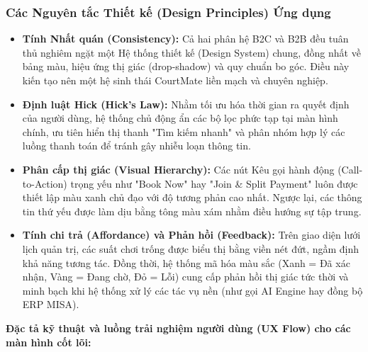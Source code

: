 \subsubsection{Các Nguyên tắc Thiết kế (Design Principles) Ứng dụng}
\begin{itemize}
    \item \textbf{Tính Nhất quán (Consistency):} Cả hai phân hệ B2C và B2B đều tuân thủ nghiêm ngặt một Hệ thống thiết kế (Design System) chung, đồng nhất về bảng màu, hiệu ứng thị giác (drop-shadow) và quy chuẩn bo góc. Điều này kiến tạo nên một hệ sinh thái CourtMate liền mạch và chuyên nghiệp.
    \item \textbf{Định luật Hick (Hick's Law):} Nhằm tối ưu hóa thời gian ra quyết định của người dùng, hệ thống chủ động ẩn các bộ lọc phức tạp tại màn hình chính, ưu tiên hiển thị thanh "Tìm kiếm nhanh" và phân nhóm hợp lý các luồng thanh toán để tránh gây nhiễu loạn thông tin.
    \item \textbf{Phân cấp thị giác (Visual Hierarchy):} Các nút Kêu gọi hành động (Call-to-Action) trọng yếu như "Book Now" hay "Join \& Split Payment" luôn được thiết lập màu xanh chủ đạo với độ tương phản cao nhất. Ngược lại, các thông tin thứ yếu được làm dịu bằng tông màu xám nhằm điều hướng sự tập trung.
    \item \textbf{Tính chi trả (Affordance) và Phản hồi (Feedback):} Trên giao diện lưới lịch quản trị, các suất chơi trống được biểu thị bằng viền nét đứt, ngầm định khả năng tương tác. Đồng thời, hệ thống mã hóa màu sắc (Xanh = Đã xác nhận, Vàng = Đang chờ, Đỏ = Lỗi) cung cấp phản hồi thị giác tức thời và minh bạch khi hệ thống xử lý các tác vụ nền (như gọi AI Engine hay đồng bộ ERP MISA).
\end{itemize}
\vspace{0.5cm}
\noindent\textbf{Đặc tả kỹ thuật và luồng trải nghiệm người dùng (UX Flow) cho các màn hình cốt lõi:}

